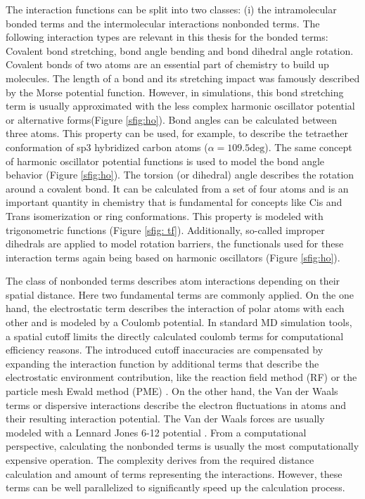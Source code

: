 The interaction functions can be split into two classes: (i) the intramolecular bonded terms and the intermolecular interactions nonbonded terms. \cite{Oostenbrink2004}
The following interaction types are relevant in this thesis for the bonded terms: Covalent bond stretching, bond angle bending and bond dihedral angle rotation.
Covalent bonds of two atoms are an essential part of chemistry to build up molecules. \cite{Pauling1934} The length of a bond and its stretching impact was famously described by the Morse potential function. \cite{Morse1929, Iozzi2009} However, in simulations, this bond stretching term is usually approximated with the less complex harmonic oscillator potential or alternative forms(Figure \ref{sfig:ho}).\cite{Oostenbrink2004} Bond angles can be calculated between three atoms. This property can be used, for example, to describe the tetraether conformation of sp3 hybridized carbon atoms ($\alpha = 109.5 \text{deg}$). \cite{Pauling1931, Slater1931} The same concept of harmonic oscillator potential functions is used to model the bond angle behavior (Figure \ref{sfig:ho}). \cite{Oostenbrink2004} 
The torsion (or dihedral) angle describes the rotation around a covalent bond. \cite{Blondel1996} It can be calculated from a set of four atoms and is an important quantity in chemistry that is fundamental for concepts like Cis and Trans isomerization \cite{Dugave2003} or ring conformations\cite{Strauss1970}. This property is modeled with trigonometric functions  (Figure \ref{sfig: tf}). \cite{Oostenbrink2004} 
Additionally, so-called improper dihedrals are applied to model rotation barriers, the functionals used for these interaction terms again being based on harmonic oscillators (Figure \ref{sfig:ho}). \cite{Oostenbrink2004,Blondel1996}

The class of nonbonded terms describes atom interactions depending on their spatial distance. Here two fundamental terms are commonly applied.
On the one hand, the electrostatic term describes the interaction of polar atoms with each other and is modeled by a Coulomb potential. \cite{Gillmor2017, Atkins2014} In standard MD simulation tools, a spatial cutoff limits the directly calculated coulomb terms for computational efficiency reasons. The introduced cutoff inaccuracies are compensated by expanding the interaction function by additional terms that describe the electrostatic environment contribution, like the reaction field method (RF) \cite{Tironi1995} or the particle mesh Ewald method (PME) \cite{Darden1993}.
On the other hand, the Van der Waals terms or dispersive interactions describe the electron fluctuations in atoms and their resulting interaction potential.\cite{Kawai2016, Margenau1939} The Van der Waals forces \cite{Margenau1939} are usually modeled with a Lennard Jones 6-12 potential \cite{Jones1924}. \cite{Oostenbrink2004}
From a computational perspective, calculating the nonbonded terms is usually the most computationally expensive operation. The complexity derives from the required distance calculation and amount of terms representing the interactions. However, these terms can be well parallelized to significantly speed up the calculation process.\cite{Berendsen1995, Schmid2012, Eastman2010, Meel2008}

